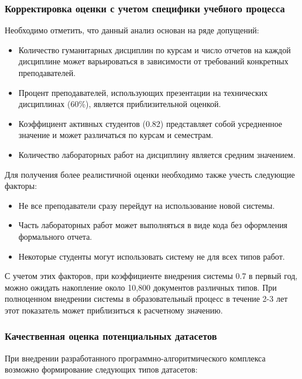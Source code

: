 \clearpage

\subsubsection{Корректировка оценки с учетом специфики учебного процесса}

Необходимо отметить, что данный анализ основан на ряде допущений:

\begin{itemize}[wide=12.5mm, leftmargin=12.5mm]
    \item Количество гуманитарных дисциплин по курсам и число отчетов на каждой дисциплине может варьироваться в зависимости от требований конкретных преподавателей.
    \item Процент преподавателей, использующих презентации на технических дисциплинах (60\%), является приблизительной оценкой.
    \item Коэффициент активных студентов (0.82) представляет собой усредненное значение и может различаться по курсам и семестрам.
    \item Количество лабораторных работ на дисциплину является средним значением.
\end{itemize}

Для получения более реалистичной оценки необходимо также учесть следующие факторы:

\begin{itemize}[wide=12.5mm, leftmargin=12.5mm]
    \item Не все преподаватели сразу перейдут на использование новой системы.
    \item Часть лабораторных работ может выполняться в виде кода без оформления формального отчета.
    \item Некоторые студенты могут использовать систему не для всех типов работ.
\end{itemize}

С учетом этих факторов, при коэффициенте внедрения системы 0.7 в первый год, можно ожидать накопление около 10,800 документов различных типов. 
При полноценном внедрении системы в образовательный процесс в течение 2-3 лет этот показатель может приблизиться к расчетному значению.

\clearpage
\subsubsection{Качественная оценка потенциальных датасетов}

При внедрении разработанного программно-алгоритмического комплекса возможно формирование следующих типов датасетов:

